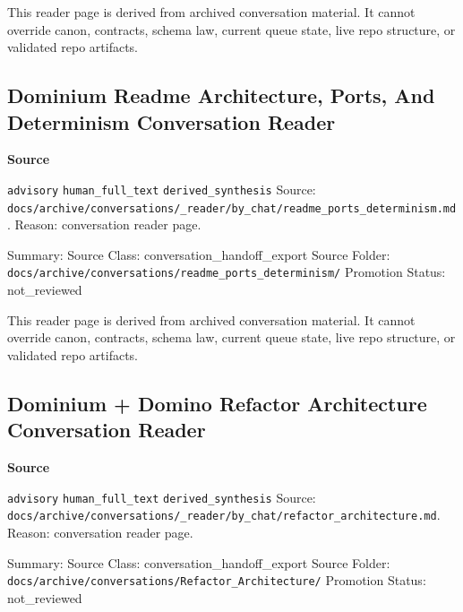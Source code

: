 \documentclass[9pt,a4paper,openany]{book}
\newcommand{\vonecallout}[3]{\par\medskip\noindent\begingroup\setlength{\fboxsep}{7pt}\colorbox{DomCalloutBg}{\parbox{0.94\linewidth}{\textbf{\textcolor{#1}{#2}}\par #3}}\endgroup\par\medskip}
\begin{document}
This reader page is derived from archived conversation material.\allowbreak{} It cannot override canon, contracts, schema law, current queue state, live repo structure, or validated repo artifacts.\allowbreak{}



\subsection{Dominium Readme Architecture, Ports, And Determinism Conversation Reader}

\vonecallout{DomSlate}{Source}{\texttt{advisory} \texttt{human\_\allowbreak{}full\_\allowbreak{}text} \texttt{derived\_\allowbreak{}synthesis} Source: \texttt{docs/\allowbreak{}archive/\allowbreak{}conversations/\allowbreak{}\_\allowbreak{}reader/\allowbreak{}by\_\allowbreak{}chat/\allowbreak{}readme\_\allowbreak{}ports\_\allowbreak{}determinism.\allowbreak{}md}.\allowbreak{} Reason: conversation reader page.\allowbreak{}}

Summary: Source Class: conversation\_\allowbreak{}handoff\_\allowbreak{}export Source Folder: \texttt{docs/\allowbreak{}archive/\allowbreak{}conversations/\allowbreak{}readme\_\allowbreak{}ports\_\allowbreak{}determinism/\allowbreak{}} Promotion Status: not\_\allowbreak{}reviewed


This reader page is derived from archived conversation material.\allowbreak{} It cannot override canon, contracts, schema law, current queue state, live repo structure, or validated repo artifacts.\allowbreak{}



\subsection{Dominium + Domino Refactor Architecture Conversation Reader}

\vonecallout{DomSlate}{Source}{\texttt{advisory} \texttt{human\_\allowbreak{}full\_\allowbreak{}text} \texttt{derived\_\allowbreak{}synthesis} Source: \texttt{docs/\allowbreak{}archive/\allowbreak{}conversations/\allowbreak{}\_\allowbreak{}reader/\allowbreak{}by\_\allowbreak{}chat/\allowbreak{}refactor\_\allowbreak{}architecture.\allowbreak{}md}.\allowbreak{} Reason: conversation reader page.\allowbreak{}}

Summary: Source Class: conversation\_\allowbreak{}handoff\_\allowbreak{}export Source Folder: \texttt{docs/\allowbreak{}archive/\allowbreak{}conversations/\allowbreak{}Refactor\_\allowbreak{}Architecture/\allowbreak{}} Promotion Status: not\_\allowbreak{}reviewed
\end{document}
